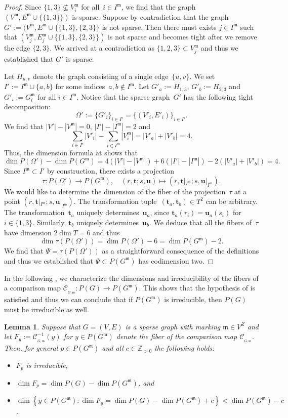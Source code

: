 \documentclass[12pt]{article}
\newtheorem{lemma}{Lemma}
\theoremstyle{definition}
\newtheorem{remark}[lemma]{Remark}
\newenvironment{Mlist}{\begin{itemize}[topsep=0pt,itemsep=0pt,leftmargin=7mm]}{\end{itemize}}
\newcommand{\END}{\hfill $\vartriangleleft$}
\newcommand{\st}{such that }
\renewcommand{\c}{\colon}
\newcommand{\set}[2]{\left\{#1:#2\right\}}
\newcommand{\Z}{{\mathbb{Z}}}
\newcommand{\cC}{\mathcal{C}}
\newcommand{\bt}{\mathbf{t}}
\newcommand{\bu}{\mathbf{u}}
\newcommand{\m}{\mathfrak{m}}
\newcommand{\CM}{\cC_{_{G,\m}}}
\begin{document}
\begin{proof}
Since $\{1,3\}\nsubseteq V^\m_i$ for all~$i\in I^\m$,
we find that the graph $(V^\m,E^\m\cup\{\{1,3\}\})$ is sparse.
Suppose by contradiction that the graph~$G':=(V^\m,E^\m\cup\{\{1,3\},\{2,3\}\}$ is not sparse.
Then there must exists $j\in I^\m$ \st
$(V^\m_j,E^\m_j\cup\{\{1,3\},\{2,3\}\})$ is not sparse and becomes tight
after we remove the edge $\{2,3\}$.
We arrived at a contradiction as $\{1,2,3\}\subset V^\m_j$
and thus we established that $G'$ is sparse.

Let $H_{u,v}$ denote the graph consisting of a single edge~$\{u,v\}$.
We set
$I':=I^\m\cup\{a,b\}$ for some indices~$a,b\notin I^\m$.
Let $G'_a:=H_{1,3}$,
$G'_b:=H_{2,3}$
and
$G'_i:=G^\m_i$
for all $i\in I^\m$.
Notice that the sparse graph~$G'$ has the following tight decomposition:
\[
\Omega':=\{G'_i\}_{i\in I'}=\{(V'_i,E'_i)\}_{i\in I'}.
\]
We find that $|V'|-|V^\m|=0$,
$|I'|-|I^\m|=2$ and
\[
\sum_{i\in I'}|V'_i|-\sum_{i\in I^\m}|V^\m_i|
=
|V'_a|+|V'_b|=4.
\]
Thus, the dimension formula at  shows that
\[
\dim P(\Omega')-\dim P(G^\m)=4\left(|V'|-|V^\m|\right)+6\left(|I'|-|I^\m|\right)-2\left(|V'_a|+|V'_b|\right)=4.
\]
Since $I^\m\subset I'$ by construction, there exists a projection
\[
\tau\c P(\Omega')\to P(G^\m),\quad
(r,\bt;s,\bu)\mapsto(r,\bt|_{I^\m};s,\bu|_{I^\m}).
\]
We would like to determine the dimension of the fiber of the projection~$\tau$
at a point $(r,\bt|_{I^\m};s,\bu|_{I^\m})$.
The transformation tuple~$(\bt_a,\bt_b)\in T^2$ can be arbitrary.
The transformation~$\bt_a$ uniquely determines~$\bu_a$,
since $\bt_a(r_i)=\bu_a(s_i)$ for $i\in\{1,3\}$.
Similarly, $\bt_b$ uniquely determines~$\bu_b$.
We deduce that all the fibers of~$\tau$ have dimension
$2\dim T=6$ and thus
\[
\dim \tau(P(\Omega'))=\dim P(\Omega')-6=\dim P(G^\m)-2.
\]
We find that $\Psi=\tau(P(\Omega'))$ as a straightforward consequence of the definitions
and thus we established that $\Psi\subset P(G^\m)$ has codimension two.
\end{proof}

In the following , we characterize the dimensions and irreducibility of
the fibers of a comparison map $\CM\c P(G)\to P(G^\m)$.
This shows that the hypothesis of  is satisfied
and thus we can conclude that if $P(G^\m)$ is irreducible,
then $P(G)$ must be irreducible as well.


\begin{lemma}
\label{lem:ifc}
Suppose that $G=(V,E)$ is a sparse graph with marking $\m\in V^Z$
and let $F_y:=\CM^{-1}(y)$ for $y\in P(G^\m)$
denote the fiber of the comparison map $\CM$.
Then, for general $p\in P(G^\m)$ and all $c\in\Z_{>0}$ the following holds:
\begin{Mlist}
\item $F_p$ is irreducible,
\item $\dim F_p=\dim P(G)-\dim P(G^\m)$, and
\item $\dim \set{y\in P(G^\m)}{\dim F_y=\dim P(G)-\dim P(G^\m)+c}<\dim P(G^\m)-c$.
\end{Mlist}
\end{lemma}
\end{document}
